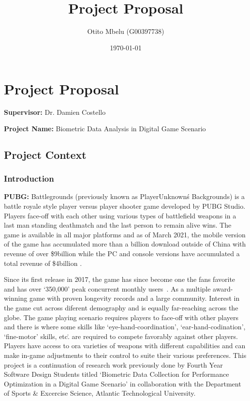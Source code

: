 \documentclass{report}
\title{Project Proposal}
\author{Otito Mbelu (G00397738)}
\date{\today}
\begin{document}
\setlength{\parindent}{0pt}
\maketitle

\chapter*{Project Proposal}
    \textbf{Supervisor:} Dr. Damien Costello \par
    \textbf{Project Name:} Biometric Data Analysis in Digital Game Scenario
    \section*{Project Context}
    \subsection*{Introduction}
    \par
    \textbf{PUBG:} Battlegrounds (previously known as PlayerUnknown\'s Backgrounds) is a battle royale style player versus
    player shooter game developed by PUBG Studio. Players face-off with each other using various types of battlefield weapons
    in a last man standing deathmatch and the last person to remain alive wins. The game is available in all major platforms
    and as of March 2021, the mobile version of the game has accumulated more than a billion download outside of China with 
    revenue of over \$9billion while the PC and console versions have accumulated a total revenue of \$4billion
    \cite{statista}.
    \par 
    Since its first release in 2017, the game has since become one the fans favorite and has over `350,000' peak concurrent 
    monthly users~\cite{statista}. As a multiple award-winning game with proven longevity records and a large community.
    Interest in the game cut across diferent demography and is equally far-reaching across the globe. 
    The game playing scenario requires players to face-off with other players and there is where some skills like 
    `eye-hand-coordination', `ear-hand-codination', `fine-motor' skills, etc\.. are required to compete favorably against 
    other players. Players have access to ora varieties of weapons with different capabilities and can make in-game adjustments
    to their control to suite their various preferences. 
    This project is a continuation of research work previously done by Fourth Year Software Design Students titled `Biometric 
    Data Collection for Performance Optimization in a Digital Game Scenario' in collaboration with the Department of Sports
     \& Excercise Science, Atlantic Technological University.
\end{document}
